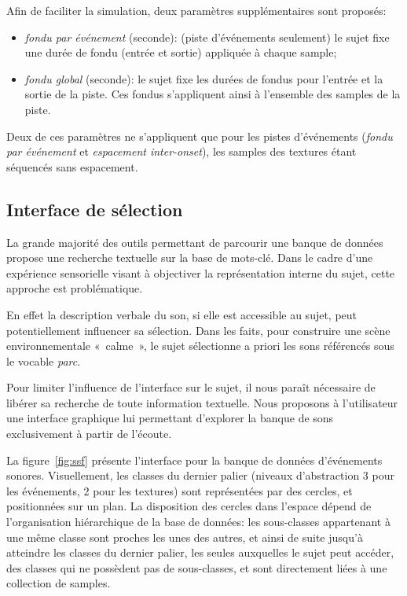 \documentclass[twoside,twocolumn]{article}
\begin{document}
Afin de faciliter la simulation, deux paramètres supplémentaires sont proposés:

\begin{itemize}
\item \emph{fondu par événement} (seconde): (piste d'événements seulement) le sujet fixe une durée de fondu (entrée et sortie) appliquée à chaque sample;
\item \emph{fondu global} (seconde): le sujet fixe les durées de fondus pour l'entrée et la sortie de la piste. Ces fondus s'appliquent ainsi à l'ensemble des samples de la piste.
\end{itemize}

Deux de ces paramètres ne s’appliquent que pour les pistes d'événements (\emph{fondu par événement}  et \emph{espacement inter-onset}), les samples des textures étant séquencés sans espacement.

\subsection{Interface de sélection}
\label{sec:simscene_ssf}

La grande majorité des outils permettant de parcourir une banque de données propose une recherche textuelle sur la base de mots-clé. Dans le cadre d'une expérience sensorielle visant à objectiver la représentation interne du sujet, cette approche est problématique.

En effet la description verbale du son, si elle est accessible au sujet, peut potentiellement influencer sa sélection. Dans les faits, pour construire une scène environnementale «~calme~», le sujet sélectionne a priori les sons référencés sous le vocable \emph{parc}.

Pour limiter l’influence de l’interface sur le sujet, il nous paraît nécessaire de libérer sa recherche de toute information textuelle. Nous proposons à l'utilisateur une interface graphique lui permettant d’explorer la banque de sons exclusivement à partir de l’écoute.

La figure~\ref{fig:ssf} présente l'interface pour la banque de données d'événements sonores. Visuellement, les classes du dernier palier (niveaux d'abstraction 3 pour les événements, 2 pour les textures) sont représentées par des cercles, et positionnées sur un plan. La disposition des cercles dans l'espace dépend de l’organisation hiérarchique de la base de données: les sous-classes appartenant à une même classe sont proches les unes des autres, et ainsi de suite jusqu'à atteindre les classes du dernier palier, les seules auxquelles le sujet peut accéder, des classes qui ne possèdent pas de sous-classes, et sont directement liées à une collection de samples.
\end{document}

